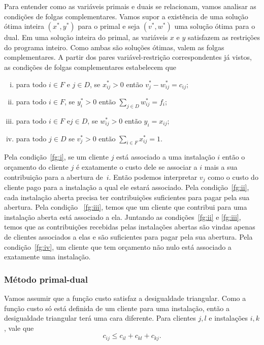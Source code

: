 \documentclass[12pt]{article}
\begin{document}
Para entender como as variáveis primais e duais se relacionam, vamos analisar as condições de folgas complementares. Vamos supor a existência de uma solução ótima inteira $(x^*,y^*)$ para o primal e seja $(v^*,w^*)$ uma solução ótima para o dual. Em uma solução inteira do primal, as variáveis $x$ e $y$ satisfazem as restrições do programa inteiro. Como ambas são soluções ótimas, valem as folgas complementares. A partir dos pares variável-restrição correspondentes já vistos, as condições de folgas complementares estabelecem que
\begin{enumerate}[(i)]
    \item para todo $i \in F$ e $j \in D$, se $x^*_{ij} > 0$ então $v^*_j - w^*_{ij} = c_{ij}$\label{fg:i};
    \item para todo $ i \in F$, se $y^*_i > 0$ então $\sum_{j \in D} w^*_{ij} = f_i$\label{fg:ii};
    \item para todo $i \in F$ e$ j \in D$, se $w^*_{ij}>0$ então $ y_i = x_{ij}$\label{fg:iii};
    \item para todo $j \in D$ se $v^*_j > 0$  então $\sum_{i \in F}x^*_{ij} = 1$\label{fg:iv}.
\end{enumerate}
Pela condição~\eqref{fg:i}, se um cliente $j$ está associado a uma instalação $i$ então o orçamento do cliente $j$ é exatamente o custo dele se associar a $i$ mais a sua contribuição para a abertura de~$i$. Então podemos interpretar $v_j$ como o custo do cliente pago para a instalação a qual ele estará associado. 
Pela condição~\eqref{fg:ii}, cada instalação aberta precisa ter contribuições suficientes para pagar pela sua abertura. Pela condição ~\eqref{fg:iii}, temos que um cliente que contribui para uma instalação aberta está associado a ela. Juntando as condições~\eqref{fg:ii} e \eqref{fg:iii}, temos que as contribuições recebidas pelas instalações abertas são vindas apenas de clientes associados a elas e são suficientes para pagar pela sua abertura. 
Pela condição~\eqref{fg:iv}, um cliente que tem orçamento não nulo está associado a exatamente uma instalação.
\newpage

\subsubsection{Método primal-dual}
Vamos assumir que a função custo satisfaz a desigualdade triangular. Como a função custo só está definida de um cliente para uma instalação, então a desigualdade triangular terá uma cara diferente. Para clientes $j,l$ e  instalações $i,k$, vale que
\[c_{ij} \leq c_{il} + c_{kl} + c_{kj}.\]
\end{document}
